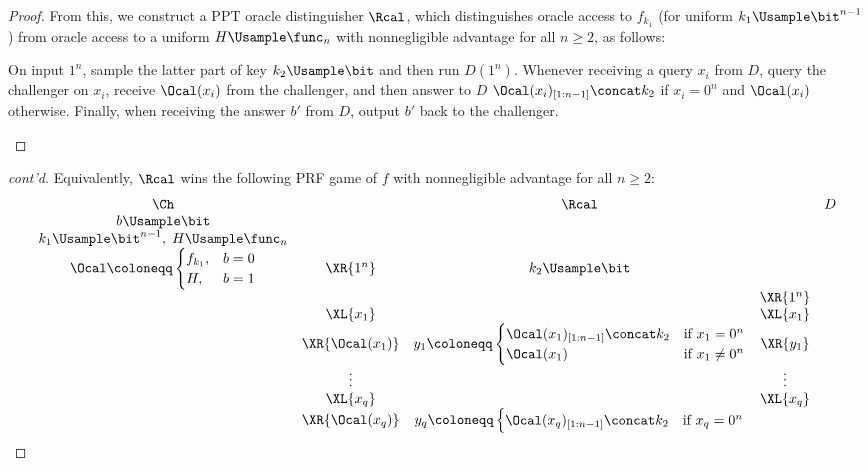 \begin{answer}[c]
\begin{proof}
        From this, we construct a PPT oracle distinguisher $\Rcal$, which distinguishes oracle access to $f_{k_1}$ (for uniform $k_1\Usample \bit^{n-1}$) from oracle access to a uniform $H\Usample\func_n$ with nonnegligible advantage for all $n\ge 2$, as follows: 
        \begin{mdframed}[style=simplebox]
            On input $1^n$, sample the latter part of key $k_2\Usample\bit$ and then run $D(1^n)$. Whenever receiving a query $x_i$ from $D$, query the challenger on $x_i$, receive $\Ocal(x_i)$ from the challenger, and then answer to $D$ $\Ocal(x_i)_{[1:n-1]}\concat k_2$ if $x_i=0^n$ and $\Ocal(x_i)$ otherwise. Finally, when receiving the answer $b'$ from $D$, output $b'$ back to the challenger. 
        \end{mdframed}
        \end{proof}\begin{proof}[cont'd]
        Equivalently, $\Rcal$ wins the following PRF game of $f$ with nonnegligible advantage for all $n\ge 2$:
        {
            \[
                \begin{array}{@{} c c c c c@{}}
                \Ch & & \Rcal & & D \\
                b\Usample\bit & & & & \\
                k_1\Usample\bit^{n-1},\; H\Usample \func_n & & & & \\
                \Ocal \coloneqq \begin{cases}
                    f_{k_1}, &b=0\\
                    H, &b=1
                \end{cases} & \XR{1^n} & k_2\Usample\bit  & & \\
                &  &  & \XR{1^n} & \\
                & \XL{x_1} & & \XL{x_1} & \\
                & \XR{\Ocal(x_1)} & y_1\coloneqq \begin{cases}
                    \Ocal(x_1)_{[1:n-1]}\concat k_2 &\textrm{if } x_1=0^n\\
                    \Ocal(x_1) &\textrm{if } x_1\neq 0^n
                \end{cases} & \XR{y_1} & \\
                & \vdots & & \vdots & \\
                & \XL{x_q} & & \XL{x_q} & \\
                & \XR{\Ocal(x_q)} & y_q\coloneqq \begin{cases}
                    \Ocal(x_q)_{[1:n-1]}\concat k_2 &\textrm{if } x_q=0^n\\

\end{cases}
\end{array}\]}
\end{proof}
\end{answer}
